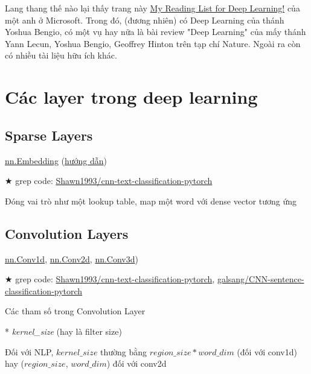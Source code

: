 Lang thang thế nào lại thấy trang này \href{https://www.microsoft.com/en-us/research/wp-content/uploads/2017/02/DL_Reading_List.pdf}{My Reading List for Deep Learning!} của một anh ở Microsoft. Trong đó, (đương nhiên) có Deep Learning của thánh Yoshua Bengio, có một vụ hay nữa là bài review "Deep Learning" của mấy thánh Yann Lecun, Yoshua Bengio, Geoffrey Hinton trên tạp chí Nature. Ngoài ra còn có nhiều tài liệu hữu ích khác.

\section{Các layer trong deep learning}

\subsection{Sparse Layers}

\href{http://pytorch.org/docs/master/nn.html#embedding}{nn.Embedding} (\href{http://pytorch.org/tutorials/beginner/nlp/word_embeddings_tutorial.html}{hướng dẫn})

★ grep code: \href{https://github.com/Shawn1993/cnn-text-classification-pytorch/blob/master/model.py#L18}{Shawn1993/cnn-text-classification-pytorch}

Đóng vai trò như một lookup table, map một word với dense vector tương ứng

\subsection{Convolution Layers}


\href{http://pytorch.org/docs/master/nn.html#conv1d}{nn.Conv1d}, \href{http://pytorch.org/docs/master/nn.html#conv2d}{nn.Conv2d}, \href{http://pytorch.org/docs/master/nn.html#conv3d}{nn.Conv3d})

★ grep code: \href{https://github.com/Shawn1993/cnn-text-classification-pytorch/blob/master/model.py#L20-L24}{Shawn1993/cnn-text-classification-pytorch}, \href{https://github.com/galsang/CNN-sentence-classification-pytorch/blob/master/model.py#L36-L38}{galsang/CNN-sentence-classification-pytorch}

Các tham số trong Convolution Layer

* \textit{kernel\_size} (hay là filter size)

Đối với NLP, $kernel\_size$ thường bằng $region\_size * word\_dim$ (đối với conv1d) hay ($region\_size$, $word\_dim$) đối với conv2d

